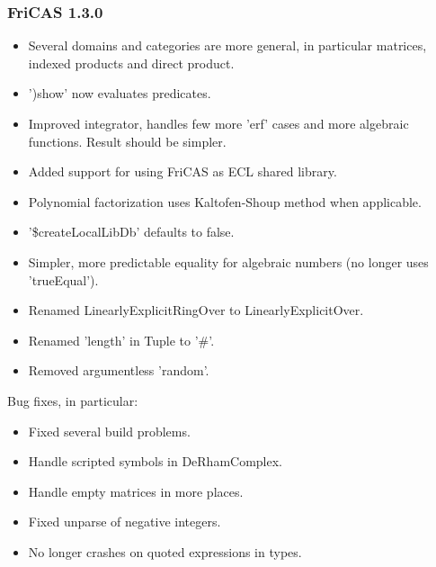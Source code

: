 \subsubsection{FriCAS 1.3.0}
\begin{itemize}

\item Several domains and categories are more general,
      in particular matrices, indexed products and
      direct product.

\item ')show' now evaluates predicates.

\item Improved integrator, handles few more 'erf' cases and
      more algebraic functions.  Result should be
      simpler.

\item Added support for using FriCAS as ECL shared library.

\item Polynomial factorization uses Kaltofen-Shoup method when
      applicable.

\item '\$createLocalLibDb' defaults to false.

\item Simpler, more predictable equality for algebraic
      numbers (no longer uses 'trueEqual').

\item Renamed LinearlyExplicitRingOver to LinearlyExplicitOver.

\item Renamed 'length' in Tuple to '\#'.

\item Removed argumentless 'random'.

\end{itemize}

Bug fixes, in particular:

\begin{itemize}

\item Fixed several build problems.

\item Handle scripted symbols in DeRhamComplex.

\item Handle empty matrices in more places.

\item Fixed unparse of negative integers.

\item No longer crashes on quoted expressions in types.

\end{itemize}

